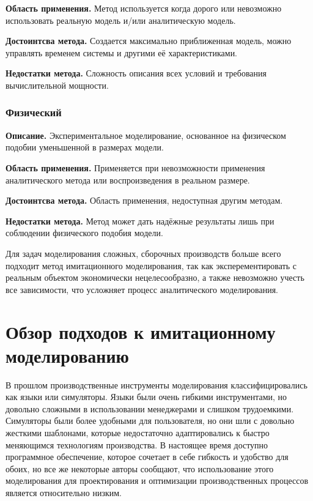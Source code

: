 \textbf{Область применения.} Метод используется когда дорого или невозможно использовать реальную модель и/или аналитическую модель.

\textbf{Достоинтсва метода.} Создается максимально приближенная модель, можно управлять временем системы и другими её характеристиками.

\textbf{Недостатки метода.} Сложность описания всех условий и требования вычислительной мощности.

\subsubsection*{Физический}
\textbf{Описание.} Экспериментальное моделирование, основанное на физическом подобии уменьшенной в размерах модели.

\textbf{Область применения.} Применяется при невозможности применения аналитического метода или воспроизведения в реальном размере.

\textbf{Достоинтсва метода.} Область применения, недоступная другим методам.

\textbf{Недостатки метода.} Метод может дать надёжные результаты лишь при соблюдении физического подобия модели.

Для задач моделирования сложных, сборочных производств больше всего подходит метод имитационного моделирования, так как эксперементировать с реальным объектом экономически нецелесообразно, а также невозможно учесть все зависимости, что усложняет процесс аналитического моделирования.

\section{Обзор подходов к имитационному моделированию}

В прошлом производственные инструменты моделирования классифицировались как языки или симуляторы. \cite{Velazco} Языки были очень гибкими инструментами, но довольно сложными в использовании менеджерами и слишком трудоемкими. Симуляторы были более удобными для пользователя, но они шли с довольно жесткими шаблонами, которые недостаточно адаптировались к быстро меняющимся технологиям производства. В настоящее время доступно программное обеспечение, которое сочетает в себе гибкость и удобство для обоих, но все же некоторые авторы сообщают, что использование этого моделирования для проектирования и оптимизации производственных процессов является относительно низким. \cite{Benedettini} \cite{Holst}

